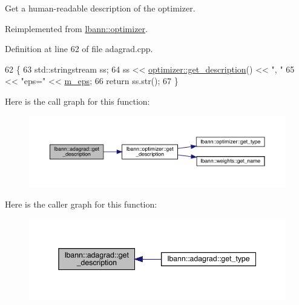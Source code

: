 Get a human-\/readable description of the optimizer. 

Reimplemented from \hyperlink{classlbann_1_1optimizer_a66bb8d28dfb41452ac1a75a3efd47723}{lbann\+::optimizer}.



Definition at line 62 of file adagrad.\+cpp.


\begin{DoxyCode}
62                                          \{
63   std::stringstream ss;
64   ss << \hyperlink{classlbann_1_1optimizer_a66bb8d28dfb41452ac1a75a3efd47723}{optimizer::get\_description}() << \textcolor{stringliteral}{", "}
65      << \textcolor{stringliteral}{"eps="} << \hyperlink{classlbann_1_1adagrad_aace057f88a46dab327f6409716dbe8de}{m\_eps};
66   \textcolor{keywordflow}{return} ss.str();
67 \}
\end{DoxyCode}
Here is the call graph for this function\+:\nopagebreak
\begin{figure}[H]
\begin{center}
\leavevmode
\includegraphics[width=350pt]{classlbann_1_1adagrad_ad8c3000c84809fab63672e9eb35c5370_cgraph}
\end{center}
\end{figure}
Here is the caller graph for this function\+:\nopagebreak
\begin{figure}[H]
\begin{center}
\leavevmode
\includegraphics[width=345pt]{classlbann_1_1adagrad_ad8c3000c84809fab63672e9eb35c5370_icgraph}
\end{center}
\end{figure}
\mbox{\label{classlbann_1_1adagrad_a7a287b367af6ef6f7f21141ad78732a7}} 
